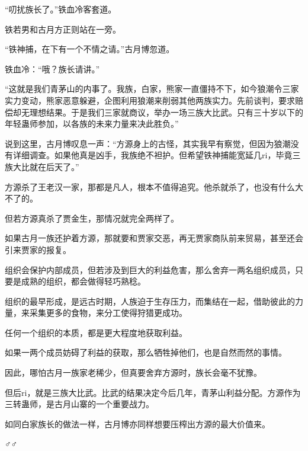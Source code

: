 \begin{this_body}
“叨扰族长了。”铁血冷客套道。

铁若男和古月方正则站在一旁。

“铁神捕，在下有一个不情之请。”古月博忽道。

铁血冷：“哦？族长请讲。”

“这就是我们青茅山的内事了。我族，白家，熊家一直僵持不下，如今狼潮令三家实力变动，熊家恶意躲避，企图利用狼潮来削弱其他两族实力。先前谈判，要求赔偿却无理想结果。于是我们三家就商议，举办一场三族大比武。只有三十岁以下的年轻蛊师参加，以各族的未来力量来决此胜负。”

说到这里，古月博叹息一声：“方源身上的古怪，其实我早有察觉，但因为狼潮没有详细调查。如果他真是凶手，我族绝不袒护。但希望铁神捕能宽延几ri，毕竟三族大比就在后天了。”

方源杀了王老汉一家，那都是凡人，根本不值得追究。他杀就杀了，也没有什么大不了的。

但若方源真杀了贾金生，那情况就完全两样了。

如果古月一族还护着方源，那就要和贾家交恶，再无贾家商队前来贸易，甚至还会引来贾家的报复。

组织会保护内部成员，但若涉及到巨大的利益危害，那么舍弃一两名组织成员，只要是成熟的组织，都会做得轻巧熟稔。

组织的最早形成，是远古时期，人族迫于生存压力，而集结在一起，借助彼此的力量，来采集更多的食物，来分工使得狩猎更成功。

任何一个组织的本质，都是更大程度地获取利益。

如果一两个成员妨碍了利益的获取，那么牺牲掉他们，也是自然而然的事情。

因此，哪怕古月一族家老稀少，但真要舍弃方源时，族长会毫不犹豫。

但后ri，就是三族大比武。比武的结果决定今后几年，青茅山利益分配。方源作为三转蛊师，是古月山寨的一个重要战力。

如同白家族长的做法一样，古月博亦同样想要压榨出方源的最大价值来。

♂♂

\end{this_body}

